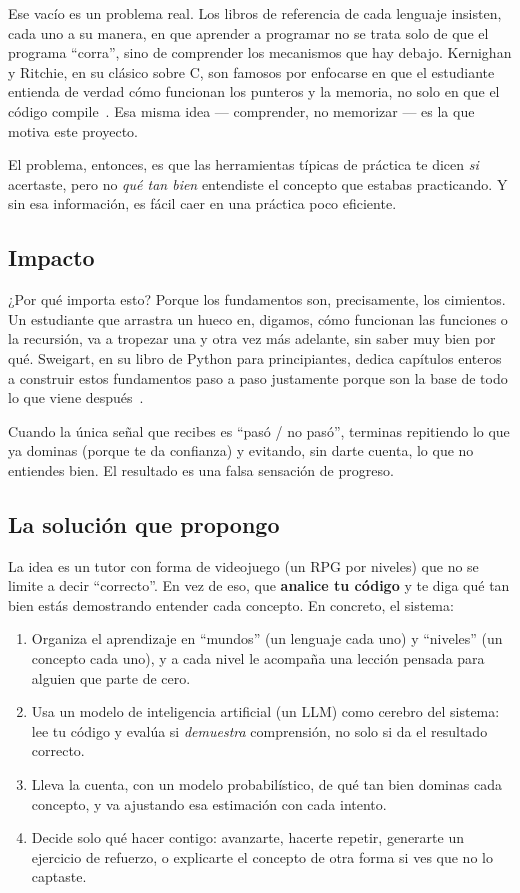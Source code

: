 \documentclass[11pt,letterpaper]{article}
\begin{document}
Ese vacío es un problema real. Los libros de referencia de cada
lenguaje insisten, cada uno a su manera, en que aprender a programar
no se trata solo de que el programa ``corra'', sino de comprender los
mecanismos que hay debajo. Kernighan y Ritchie, en su clásico sobre C,
son famosos por enfocarse en que el estudiante entienda de verdad cómo
funcionan los punteros y la memoria, no solo en que el código
compile~\cite{kr}. Esa misma idea --- comprender, no memorizar --- es
la que motiva este proyecto.

El problema, entonces, es que las herramientas típicas de práctica te
dicen \textit{si} acertaste, pero no \textit{qué tan bien} entendiste
el concepto que estabas practicando. Y sin esa información, es fácil
caer en una práctica poco eficiente.

\subsection{Impacto}
¿Por qué importa esto? Porque los fundamentos son, precisamente, los
cimientos. Un estudiante que arrastra un hueco en, digamos, cómo
funcionan las funciones o la recursión, va a tropezar una y otra vez
más adelante, sin saber muy bien por qué. Sweigart, en su libro de
Python para principiantes, dedica capítulos enteros a construir estos
fundamentos paso a paso justamente porque son la base de todo lo que
viene después~\cite{sweigart}.

Cuando la única señal que recibes es ``pasó / no pasó'', terminas
repitiendo lo que ya dominas (porque te da confianza) y evitando, sin
darte cuenta, lo que no entiendes bien. El resultado es una falsa
sensación de progreso.

\subsection{La solución que propongo}
La idea es un tutor con forma de videojuego (un RPG por niveles) que no
se limite a decir ``correcto''. En vez de eso, que \textbf{analice tu
código} y te diga qué tan bien estás demostrando entender cada
concepto. En concreto, el sistema:

\begin{enumerate}[leftmargin=*]
  \item Organiza el aprendizaje en ``mundos'' (un lenguaje cada uno) y
  ``niveles'' (un concepto cada uno), y a cada nivel le acompaña una
  lección pensada para alguien que parte de cero.
  \item Usa un modelo de inteligencia artificial (un LLM) como cerebro
  del sistema: lee tu código y evalúa si \textit{demuestra}
  comprensión, no solo si da el resultado correcto.
  \item Lleva la cuenta, con un modelo probabilístico, de qué tan bien
  dominas cada concepto, y va ajustando esa estimación con cada
  intento.
  \item Decide solo qué hacer contigo: avanzarte, hacerte repetir,
  generarte un ejercicio de refuerzo, o explicarte el concepto de otra
  forma si ves que no lo captaste.
\end{enumerate}
\end{document}
